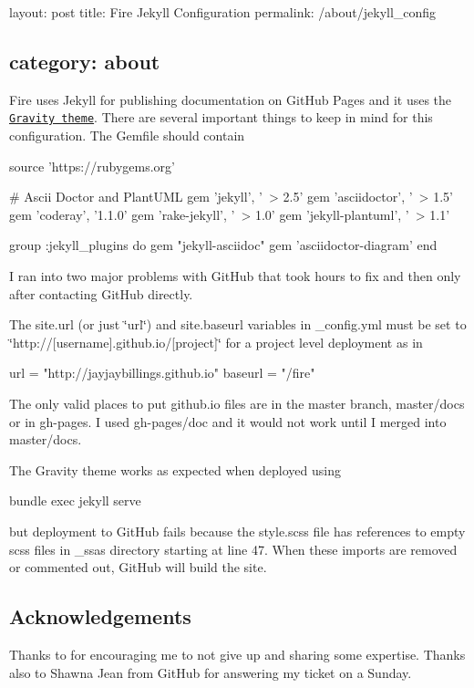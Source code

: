 

 layout\+: post title\+: Fire Jekyll Configuration permalink\+: /about/jekyll\+\_\+config \subsection*{category\+: about }

Fire uses Jekyll for publishing documentation on Git\+Hub Pages and it uses the \href{http://hemangsk.github.io/Gravity/}{\tt Gravity theme}. There are several important things to keep in mind for this configuration. The Gemfile should contain


\begin{DoxyCode}
source 'https://rubygems.org'

# Ascii Doctor and PlantUML
gem 'jekyll', '~> 2.5'
gem 'asciidoctor', '~> 1.5'
gem 'coderay', '1.1.0'
gem 'rake-jekyll', '~> 1.0'
gem 'jekyll-plantuml', '~> 1.1' 

group :jekyll\_plugins do
  gem "jekyll-asciidoc"
  gem 'asciidoctor-diagram' 
end
\end{DoxyCode}


I ran into two major problems with Git\+Hub that took hours to fix and then only after contacting Git\+Hub directly.


\begin{DoxyItemize}
\item The site.\+url (or just \char`\"{}url\char`\"{}) and site.\+baseurl variables in \+\_\+config.\+yml must be set to \char`\"{}http\+://\mbox{[}username\mbox{]}.\+github.\+io/\mbox{[}project\mbox{]}\char`\"{} for a project level deployment as in
\end{DoxyItemize}


\begin{DoxyCode}
url = "http://jayjaybillings.github.io"
baseurl = "/fire"
\end{DoxyCode}



\begin{DoxyItemize}
\item The only valid places to put github.\+io files are in the master branch, master/docs or in gh-\/pages. I used gh-\/pages/doc and it would not work until I merged into master/docs.
\end{DoxyItemize}

The Gravity theme works as expected when deployed using


\begin{DoxyCode}
bundle exec jekyll serve
\end{DoxyCode}


but deployment to Git\+Hub fails because the style.\+scss file has references to empty scss files in \+\_\+ssas directory starting at line 47. When these imports are removed or commented out, Git\+Hub will build the site.

\subsection*{Acknowledgements }

Thanks to  for encouraging me to not give up and sharing some expertise. Thanks also to Shawna Jean from Git\+Hub for answering my ticket on a Sunday. 